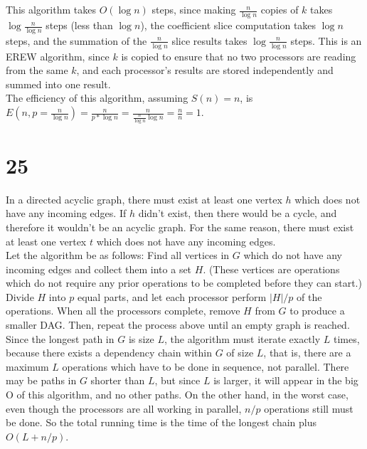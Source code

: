 \documentclass[letterpaper,notitlepage,twoside]{article}
\begin{document}
\\\\
This algorithm takes $O(\log n)$ steps, since making $\frac{n}{\log n}$ copies of $k$ takes $\log \frac{n}{\log n}$ steps (less than $\log n$), the coefficient slice computation takes $\log n$ steps, and the summation of the $\frac{n}{\log n}$ slice results takes $\log \frac{n}{\log n}$ steps. This is an EREW algorithm, since $k$ is copied to ensure that no two processors are reading from the same $k$, and each processor's results are stored independently and summed into one result.
\\
The efficiency of this algorithm, assuming $S(n) = n$, is $E(n, p = \frac{n}{\log n}) = \frac{n}{p * \log n} = \frac{n}{\frac{n}{\log n} \log n} = \frac{n}{n} = 1$.

\section*{25}
In a directed acyclic graph, there must exist at least one vertex $h$ which does not have any incoming edges. If $h$ didn't exist, then there would be a cycle, and therefore it wouldn't be an acyclic graph. For the same reason, there must exist at least one vertex $t$ which does not have any incoming edges.
\\
Let the algorithm be as follows:
Find all vertices in $G$ which do not have any incoming edges and collect them into a set $H$. (These vertices are operations which do not require any prior operations to be completed before they can start.) Divide $H$ into $p$ equal parts, and let each processor perform $|H|/p$ of the operations. When all the processors complete, remove $H$ from $G$ to produce a smaller DAG. Then, repeat the process above until an empty graph is reached.
\\
Since the longest path in $G$ is size $L$, the algorithm must iterate exactly $L$ times, because there exists a dependency chain within $G$ of size $L$, that is, there are a maximum $L$ operations which have to be done in sequence, not parallel. There may be paths in $G$ shorter than $L$, but since $L$ is larger, it will appear in the big O of this algorithm, and no other paths. On the other hand, in the worst case, even though the processors are all working in parallel, $n/p$ operations still must be done. So the total running time is the time of the longest chain plus $O(L + n/p)$.
\end{document}

